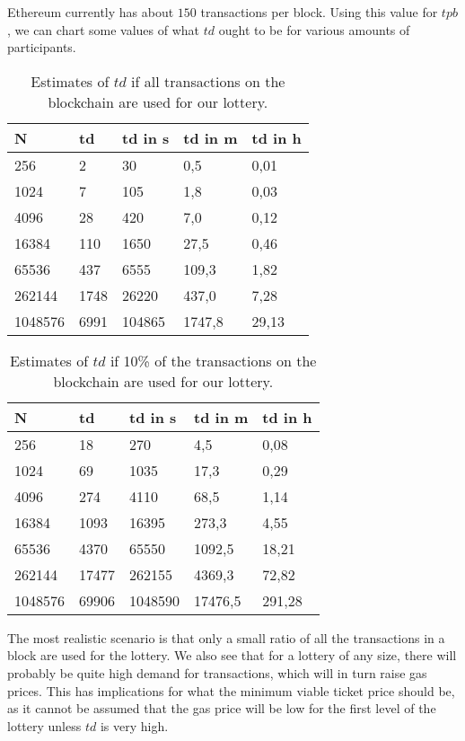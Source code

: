 Ethereum currently has about $150$ transactions per block. Using this value for $tpb$, we can chart some values of what $td$ ought to be for various amounts of participants.

\begin{table}[h]
\centering
\caption{Estimates of $td$ if all transactions on the blockchain are used for our lottery.}
\begin{tabular}{|l|l|l|l|l|}
\hline

N & td & td in s & td in m & td in h \\ \hline
256 & 2 & 30 & 0,5 & 0,01 \\ \hline
1024 & 7 & 105 & 1,8 & 0,03 \\ \hline
4096 & 28 & 420 & 7,0 & 0,12 \\ \hline
16384 & 110 & 1650 & 27,5 & 0,46 \\ \hline
65536 & 437 & 6555 & 109,3 & 1,82 \\ \hline
262144 & 1748 & 26220 & 437,0 & 7,28 \\ \hline
1048576 & 6991 & 104865 & 1747,8 & 29,13 \\ \hline

\end{tabular}
\end{table}

\begin{table}[h]
\centering
\caption{Estimates of $td$ if 10\% of the transactions on the blockchain are used for our lottery.}
\begin{tabular}{|l|l|l|l|l|}
\hline

N & td & td in s & td in m & td in h \\ \hline
256 & 18 & 270 & 4,5 & 0,08 \\ \hline
1024 & 69 & 1035 & 17,3 & 0,29 \\ \hline
4096 & 274 & 4110 & 68,5 & 1,14 \\ \hline
16384 & 1093 & 16395 & 273,3 & 4,55 \\ \hline
65536 & 4370 & 65550 & 1092,5 & 18,21 \\ \hline
262144 & 17477 & 262155 & 4369,3 & 72,82 \\ \hline
1048576 & 69906 & 1048590 & 17476,5 & 291,28 \\ \hline

\end{tabular}
\end{table}

The most realistic scenario is that only a small ratio of all the transactions in a block are used for the lottery. We also see that for a lottery of any size, there will probably be quite high demand for transactions, which will in turn raise gas prices. This has implications for what the minimum viable ticket price should be, as it cannot be assumed that the gas price will be low for the first level of the lottery unless $td$ is very high.


